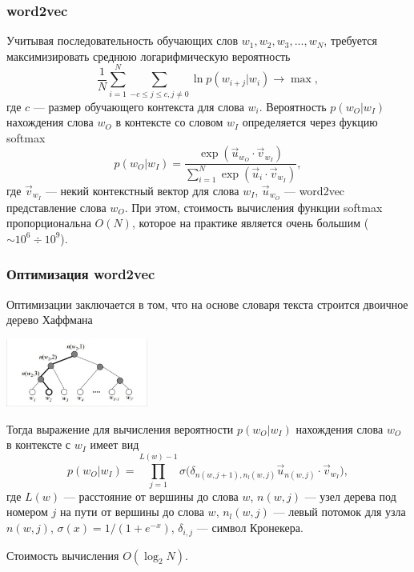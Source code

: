 \documentclass[compress,professionalfont]{beamer}
\begin{document}
\begin{frame}
\frametitle{word2vec}

Учитывая последовательность обучающих слов $w_1, w_2, w_3, ..., w_N$, требуется максимизировать среднюю логарифмическую вероятность
$$
\dfrac{1}{N}\sum_{i=1}^{N}\sum_{-c \leqslant j \leqslant c, j \neq 0} \ln p(w_{i+j}|w_i) \rightarrow \max,
$$
где $c$ --- размер обучающего контекста для слова $w_i$. Вероятность $p(w_O|w_I)$ нахождения слова $w_O$ в контексте со словом $w_I$ определяется через фукцию softmax
$$
p(w_O|w_I) = \dfrac{\exp({\vec{u}_{w_O}\cdot\vec{v}_{w_I}})}{\sum_{i=1}^{N} \exp({\vec{u}_{i} \cdot \vec{v}_{w_I}})},
$$
где $\vec{v}_{w_I}$ --- некий контекстный вектор для слова $w_I$, $\vec{u}_{w_O}$ --- word2vec представление слова $w_O$.
При этом, стоимость вычисления функции softmax пропорциональна $O(N)$, которое на практике является очень большим ($\sim10^6\div10^9$).


\end{frame}

\begin{frame}
\frametitle{Оптимизация word2vec}

Оптимизации заключается в том, что на основе словаря текста строится двоичное дерево Хаффмана
\begin{center}
\includegraphics[width=0.35\textwidth]{huffman.jpg}
\end{center}

Тогда выражение для вычисления вероятности $p(w_O|w_I)$ нахождения слова $w_O$ в контексте с $w_I$ имеет вид
$$
p(w_O|w_I) = \prod\limits_{j=1}^{L(w)-1} \sigma \Big(\delta_{n(w,j+1), n_l(w,j)} \vec{u}_{n(w,j)} \cdot \vec{v}_{w_I} \Big),
$$
где $L(w)$ --- расстояние от вершины до слова $w$, $n(w, j)$ --- узел дерева под номером $j$ на пути от вершины до слова $w$, $n_l(w,j)$ --- левый потомок для узла $n(w,j)$, $\sigma(x) = 1 / (1 + e^{-x})$, $\delta_{i,j}$ --- символ Кронекера.

Стоимость вычисления $O(\log_2 N)$.

\end{frame}
\end{document}
